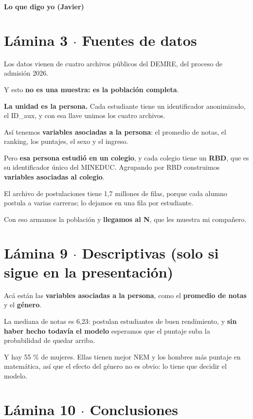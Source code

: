 \documentclass[11pt]{article}
\begin{document}
{\LARGE\bfseries Lo que digo yo (Javier)\par}\medskip

\section*{Lámina 3 $\cdot$ Fuentes de datos}

\begin{guion}Los datos vienen de cuatro archivos públicos del DEMRE, del proceso de admisión 2026.\par Y esto \textbf{no es una muestra: es la población completa}.\par \textbf{La unidad es la persona.} Cada estudiante tiene un identificador anonimizado, el ID\_aux, y con esa llave unimos los cuatro archivos.\par Así tenemos \textbf{variables asociadas a la persona}: el promedio de notas, el ranking, los puntajes, el sexo y el ingreso.\par Pero \textbf{esa persona estudió en un colegio}, y cada colegio tiene un \textbf{RBD}, que es su identificador único del MINEDUC. Agrupando por RBD construimos \textbf{variables asociadas al colegio}.\par El archivo de postulaciones tiene 1,7 millones de filas, porque cada alumno postula a varias carreras; lo dejamos en una fila por estudiante.\par Con eso armamos la población y \textbf{llegamos al N}, que les muestra mi compañero.\end{guion}

\section*{Lámina 9 $\cdot$ Descriptivas (solo si sigue en la presentación)}

\begin{guion}Acá están las \textbf{variables asociadas a la persona}, como el \textbf{promedio de notas} y el \textbf{género}.\par La mediana de notas es 6,23: postulan estudiantes de buen rendimiento, y \textbf{sin haber hecho todavía el modelo} esperamos que el puntaje suba la probabilidad de quedar arriba.\par Y hay 55 \% de mujeres. Ellas tienen mejor NEM y los hombres más puntaje en matemática, así que el efecto del género no es obvio: lo tiene que decidir el modelo.\end{guion}

\section*{Lámina 10 $\cdot$ Conclusiones}
\end{document}
